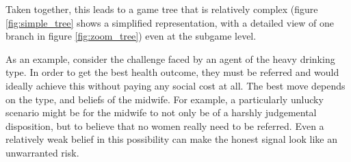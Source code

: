 \begin{table}
\center
{}



\caption{Payoff matrices\label{tab:Payoff-matrix}}
\end{table}

Taken together, this leads to a game tree that is relatively complex (figure \ref{fig:simple_tree} shows a simplified representation, with a detailed view of one branch in figure \ref{fig:zoom_tree}) even at the subgame level. 

As an example, consider the challenge faced by an agent of the heavy drinking type. In order to get the best health outcome, they must be referred and would ideally achieve this without paying any social cost at all. The best move depends on the type, and beliefs of the midwife. For example, a particularly unlucky scenario might be for the midwife to not only be of a harshly judgemental disposition, but to believe that no women really need to be referred. Even a relatively weak belief in this possibility can make the honest signal look like an unwarranted risk.

